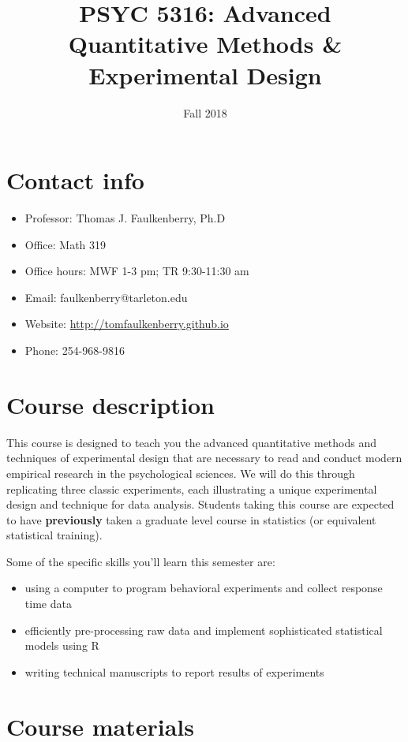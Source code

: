 \documentclass[10pt]{article}
\date{Fall 2018}
\title{PSYC 5316: Advanced Quantitative Methods \& Experimental Design}
\begin{document}
\maketitle

\section*{Contact info}
\label{sec:org7a9b773}
\begin{itemize}
\item Professor: Thomas J. Faulkenberry, Ph.D
\item Office: Math 319
\item Office hours: MWF 1-3 pm; TR 9:30-11:30 am
\item Email: faulkenberry@tarleton.edu
\item Website: \url{http://tomfaulkenberry.github.io}
\item Phone: 254-968-9816
\end{itemize}

\section*{Course description}
\label{sec:orgac5d60e}

This course is designed to teach you the advanced quantitative methods and techniques of experimental design that are necessary to read and conduct modern empirical research in the psychological sciences. We will do this through replicating three classic experiments, each illustrating a unique experimental design and technique for data analysis.  Students taking this course are expected to have \textbf{previously} taken a graduate level course in statistics (or equivalent statistical training). 

Some of the specific skills you'll learn this semester are:
\begin{itemize}
\item using a computer to program behavioral experiments and collect response time data
\item efficiently pre-processing raw data and implement sophisticated statistical models using R
\item writing technical manuscripts to report results of experiments
\end{itemize}

\section*{Course materials}
\label{sec:org5651d29}
\end{document}
